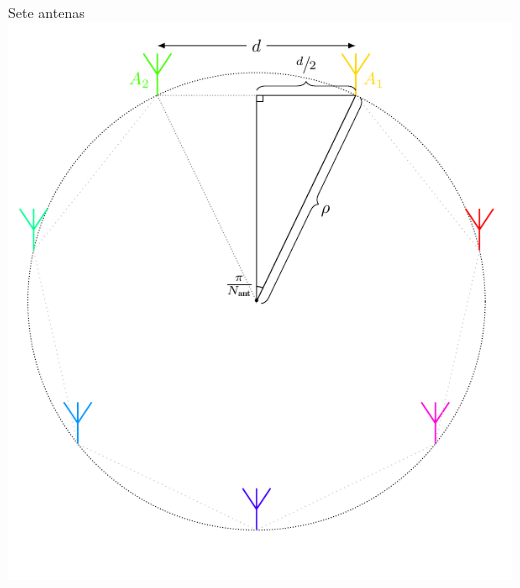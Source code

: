     \begin{frame}{Sete antenas}
        \centering%
            \includegraphics[scale=0.8]{../pictures/antennas_7.pdf}%
    \end{frame}

